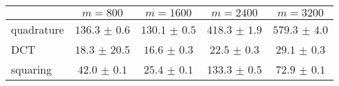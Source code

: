 \centering
\renewcommand{\arraystretch}{1.2}
\begin{tabular}{@{}lcccc@{}}
\toprule
 & $m=800$ & $m=1600$ & $m=2400$ & $m=3200$\\
\midrule
quadrature & $136.3$ $\pm$ $0.6$ & $130.1$ $\pm$ $0.5$ & $418.3$ $\pm$ $1.9$ & $579.3$ $\pm$ $4.0$ \\
DCT & $18.3$ $\pm$ $20.5$ & $16.6$ $\pm$ $0.3$ & $22.5$ $\pm$ $0.3$ & $29.1$ $\pm$ $0.3$ \\
squaring & $42.0$ $\pm$ $0.1$ & $25.4$ $\pm$ $0.1$ & $133.3$ $\pm$ $0.5$ & $72.9$ $\pm$ $0.1$ \\
\bottomrule
\end{tabular}
